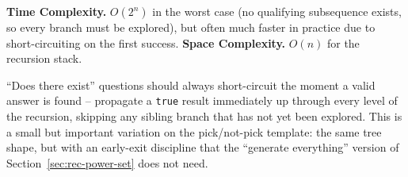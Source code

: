 \begin{complexitybox}
\textbf{Time Complexity.} $O(2^n)$ in the worst case (no qualifying
subsequence exists, so every branch must be explored), but often much
faster in practice due to short-circuiting on the first success.
\textbf{Space Complexity.} $O(n)$ for the recursion stack.
\end{complexitybox}

\begin{takeawaybox}
``Does there exist'' questions should always short-circuit the moment a
valid answer is found -- propagate a \texttt{true} result immediately up
through every level of the recursion, skipping any sibling branch that
has not yet been explored. This is a small but important variation on
the pick/not-pick template: the same tree shape, but with an early-exit
discipline that the ``generate everything'' version of
Section~\ref{sec:rec-power-set} does not need.
\end{takeawaybox}
